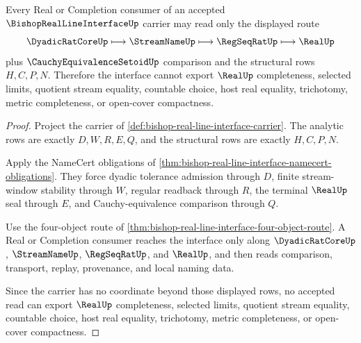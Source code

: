 \begin{theorem}
\label{thm:bishop-real-line-interface-completion-boundary-refusal}
Every Real or Completion consumer of an accepted $\BishopRealLineInterfaceUp$ carrier may read only the displayed route
$$
\DyadicRatCoreUp \longmapsto \StreamNameUp \longmapsto \RegSeqRatUp \longmapsto \RealUp
$$
plus $\CauchyEquivalenceSetoidUp$ comparison and the structural rows $H,C,P,N$. Therefore the interface cannot export $\RealUp$ completeness, selected limits, quotient stream equality, countable choice, host real equality, trichotomy, metric completeness, or open-cover compactness.
\end{theorem}
\begin{proof}
Project the carrier of \autoref{def:bishop-real-line-interface-carrier}. The analytic rows are exactly $D,W,R,E,Q$, and the structural rows are exactly $H,C,P,N$.

Apply the NameCert obligations of \autoref{thm:bishop-real-line-interface-namecert-obligations}. They force dyadic tolerance admission through $D$, finite stream-window stability through $W$, regular readback through $R$, the terminal $\RealUp$ seal through $E$, and Cauchy-equivalence comparison through $Q$.

Use the four-object route of \autoref{thm:bishop-real-line-interface-four-object-route}. A Real or Completion consumer reaches the interface only along $\DyadicRatCoreUp$, $\StreamNameUp$, $\RegSeqRatUp$, and $\RealUp$, and then reads comparison, transport, replay, provenance, and local naming data.

Since the carrier has no coordinate beyond those displayed rows, no accepted read can export $\RealUp$ completeness, selected limits, quotient stream equality, countable choice, host real equality, trichotomy, metric completeness, or open-cover compactness.
\end{proof}

